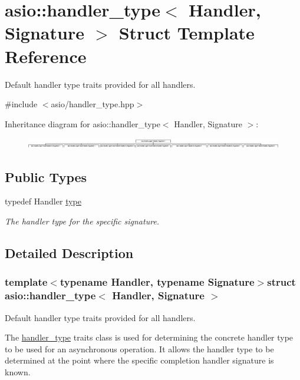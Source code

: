 \hypertarget{structasio_1_1handler__type}{}\section{asio\+:\+:handler\+\_\+type$<$ Handler, Signature $>$ Struct Template Reference}
\label{structasio_1_1handler__type}


Default handler type traits provided for all handlers.  




{\ttfamily \#include $<$asio/handler\+\_\+type.\+hpp$>$}

Inheritance diagram for asio\+:\+:handler\+\_\+type$<$ Handler, Signature $>$\+:\begin{figure}[H]
\begin{center}
\leavevmode
\includegraphics[height=0.458453cm]{structasio_1_1handler__type}
\end{center}
\end{figure}
\subsection*{Public Types}
\begin{DoxyCompactItemize}
\item 
typedef Handler \hyperlink{structasio_1_1handler__type_af26f1822b7ff708de592f20a12b140fc}{type}
\begin{DoxyCompactList}\small\item\em The handler type for the specific signature. \end{DoxyCompactList}\end{DoxyCompactItemize}


\subsection{Detailed Description}
\subsubsection*{template$<$typename Handler, typename Signature$>$struct asio\+::handler\+\_\+type$<$ Handler, Signature $>$}

Default handler type traits provided for all handlers. 

The \hyperlink{structasio_1_1handler__type}{handler\+\_\+type} traits class is used for determining the concrete handler type to be used for an asynchronous operation. It allows the handler type to be determined at the point where the specific completion handler signature is known.

